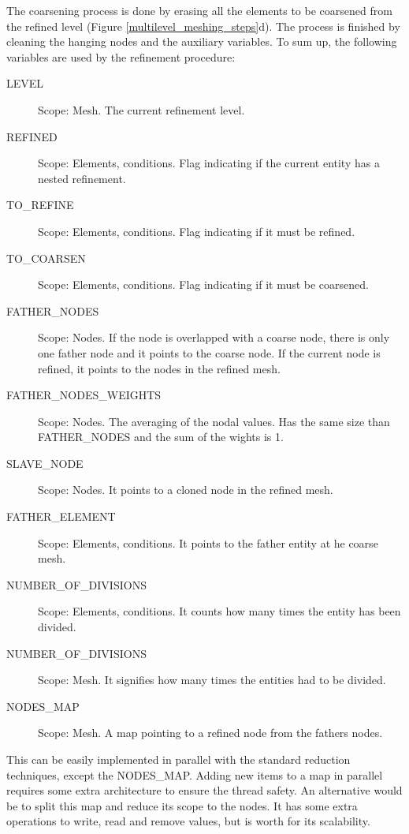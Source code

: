 The coarsening process is done by erasing all the elements to be coarsened from the refined level (Figure \ref{multilevel_meshing_steps}{\color{wrmBlue}d}). The process is finished by cleaning the hanging nodes and the auxiliary variables.
To sum up, the following variables are used by the refinement procedure:
\begin{description}
    \item[LEVEL] Scope: Mesh. The current refinement level.
    \item[REFINED] Scope: Elements, conditions. Flag indicating if the current entity has a nested refinement.
    \item[TO\_REFINE] Scope: Elements, conditions. Flag indicating if it must be refined.
    \item[TO\_COARSEN] Scope: Elements, conditions. Flag indicating if it must be coarsened.
    \item[FATHER\_NODES] Scope: Nodes. If the node is overlapped with a coarse node, there is only one father node and it points to the coarse node. If the current node is refined, it points to the nodes in the refined mesh.
    \item[FATHER\_NODES\_WEIGHTS] Scope: Nodes. The averaging of the nodal values. Has the same size than FATHER\_NODES and the sum of the wights is 1.
    \item[SLAVE\_NODE] Scope: Nodes. It points to a cloned node in the refined mesh.
    \item[FATHER\_ELEMENT] Scope: Elements, conditions. It points to the father entity at he coarse mesh.
    \item[NUMBER\_OF\_DIVISIONS] Scope: Elements, conditions. It counts how many times the entity has been divided.
    \item[NUMBER\_OF\_DIVISIONS] Scope: Mesh. It signifies how many times the entities had to be divided.
    \item[NODES\_MAP] Scope: Mesh. A map pointing to a refined node from the fathers nodes.
\end{description}


This can be easily implemented in parallel with the standard reduction techniques, except the NODES\_MAP. Adding new items to a map in parallel requires some extra architecture to ensure the thread safety. An alternative would be to split this map and reduce its scope to the nodes. It has some extra operations to write, read and remove values, but is worth for its scalability.



